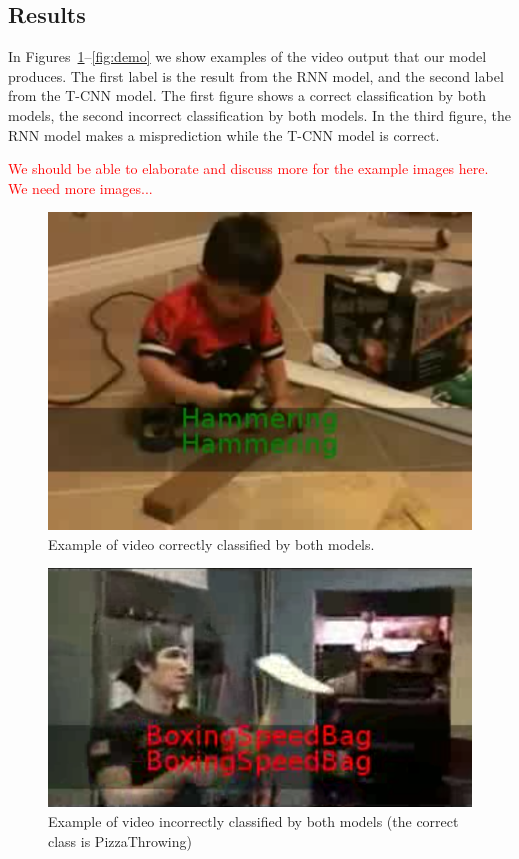 
\subsection{Results}
In Figures~\ref{fig:democorrect}--\ref{fig:demo} we show examples of the video output that our model produces. The first label is the result from the RNN model, and the second label from the T-CNN model. The first figure shows a correct classification by both models, the second incorrect classification by both models. In the third figure, the RNN model makes a misprediction while the T-CNN model is correct.  

\textcolor{red}{We should be able to elaborate and discuss more for the example images here. We need more images...} 



\begin{figure}
  \centering
  \includegraphics[width=0.8\linewidth]{figs/democorrect}
  \caption{Example of video correctly classified by both models.}
  \label{fig:democorrect}
\end{figure}


\begin{figure}
  \centering
  \includegraphics[width=0.8\linewidth]{figs/demoincorrect}
  \caption{Example of video incorrectly classified by both models (the correct class is PizzaThrowing)}
  \label{fig:demoincorrect}
\end{figure}

